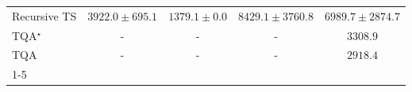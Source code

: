 \begin{tabular}{l|cccc|}
Recursive TS & {\cellcolor[HTML]{9CB9D9}} \color[HTML]{000000} $3922.0\pm 695.1$ & {\cellcolor[HTML]{F6EFF7}} \color[HTML]{000000} $1379.1\pm 0.0$ & {\cellcolor[HTML]{023858}} \color[HTML]{F1F1F1} $8429.1\pm 3760.8$ & {\cellcolor[HTML]{0566A0}} \color[HTML]{F1F1F1} $6989.7\pm 2874.7$ \\
TQA$^\star$ & {\cellcolor[HTML]{000000}} \color[HTML]{F1F1F1} {\cellcolor{white}} \color{black} - & {\cellcolor[HTML]{000000}} \color[HTML]{F1F1F1} {\cellcolor{white}} \color{black} - & {\cellcolor[HTML]{000000}} \color[HTML]{F1F1F1} {\cellcolor{white}} \color{black} - & {\cellcolor[HTML]{B9C6E0}} \color[HTML]{000000} $3308.9$ \\
TQA & {\cellcolor[HTML]{000000}} \color[HTML]{F1F1F1} {\cellcolor{white}} \color{black} - & {\cellcolor[HTML]{000000}} \color[HTML]{F1F1F1} {\cellcolor{white}} \color{black} - & {\cellcolor[HTML]{000000}} \color[HTML]{F1F1F1} {\cellcolor{white}} \color{black} - & {\cellcolor[HTML]{CCCFE5}} \color[HTML]{000000} $2918.4$ \\
\cline{1-5}
\bottomrule
\end{tabular}
